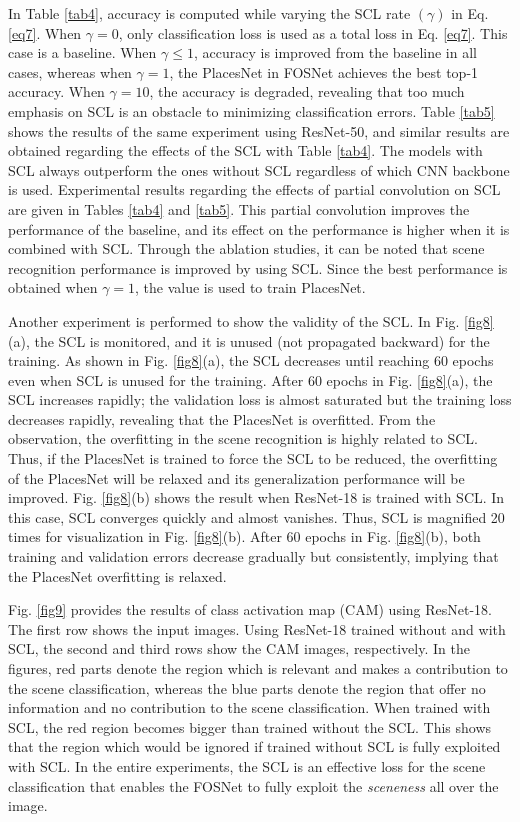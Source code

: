 \documentclass[journal,comsoc]{IEEEtran}
\begin{document}
In Table \ref{tab4}, accuracy is computed while varying the SCL rate $\left( \gamma \right)$ in Eq. \ref{eq7}. When $\gamma=0$, only classification loss is used as a total loss in Eq. \ref{eq7}. This case is a baseline. When $\gamma \le 1$, accuracy is improved from the baseline in all cases, whereas when $\gamma = 1$, the PlacesNet in FOSNet achieves the best top-1 accuracy. When $\gamma = 10$, the accuracy is degraded, revealing that too much emphasis on SCL is an obstacle to minimizing classification errors. Table \ref{tab5} shows the results of the same experiment using ResNet-50, and similar results are obtained regarding the effects of the SCL with Table \ref{tab4}. The models with SCL always outperform the ones without SCL regardless of which CNN backbone is used. Experimental results regarding the effects of partial convolution \cite{b24} on SCL are given in Tables \ref{tab4} and \ref{tab5}. This partial convolution improves the performance of the baseline, and its effect on the performance is higher when it is combined with SCL. Through the ablation studies, it can be noted that scene recognition performance is improved by using SCL. Since the best performance is obtained when $\gamma = 1$, the value is used to train PlacesNet.

Another experiment is performed to show the validity of the SCL. In Fig. \ref{fig8}(a), the SCL is monitored, and it is unused (not propagated backward) for the training. As shown in Fig. \ref{fig8}(a), the SCL decreases until reaching 60 epochs even when SCL is unused for the training. After 60 epochs in Fig. \ref{fig8}(a), the SCL increases rapidly; the validation loss is almost saturated but the training loss decreases rapidly, revealing that the PlacesNet is overfitted. From the observation, the overfitting in the scene recognition is highly related to SCL. Thus, if the PlacesNet is trained to force the SCL to be reduced, the overfitting of the PlacesNet will be relaxed and its generalization performance will be improved. Fig. \ref{fig8}(b) shows the result when ResNet-18 is trained with SCL. In this case, SCL converges quickly and almost vanishes. Thus, SCL is magnified 20 times for visualization in Fig. \ref{fig8}(b). After 60 epochs in Fig. \ref{fig8}(b), both training and validation errors decrease gradually but consistently, implying that the PlacesNet overfitting is relaxed.

Fig. \ref{fig9} provides the results of class activation map (CAM) \cite{b25} using ResNet-18. The first row shows the input images. Using ResNet-18 trained without and with SCL, the second and third rows show the CAM images, respectively. In the figures, red parts denote the region which is relevant and makes a contribution to the scene classification, whereas the blue parts denote the region that offer no information and no contribution to the scene classification. When trained with SCL, the red region becomes bigger than trained without the SCL. This shows that the region which would be ignored if trained without SCL is fully exploited with SCL. In the entire experiments, the SCL is an effective loss for the scene classification that enables the FOSNet to fully exploit the \textit{sceneness} all over the image.
\end{document}
